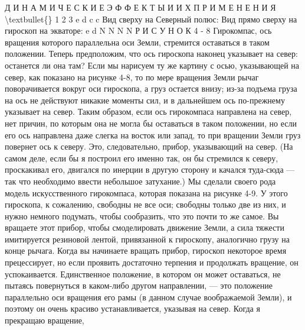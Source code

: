 \documentclass[10pt,oneside]{article}
\begin{document}
Д И Н А М И Ч Е С К И Е  Э Ф Ф Е К Т Ы  И  И Х  П Р И М Е Н Е Н И Я \textbackslash{}textbullet\{\} 1 2 3 e d c c Вид сверху на Северный полюс: Вид прямо сверху на гироскоп на экваторе: e d N N N N Р И С У Н О К  4 - 8 Гирокомпас, ось вращения которого параллельна оси Земли, стремится оставаться в таком положении. Теперь предположим, что ось гироскопа наконец указывает на север: останется ли она там? Если мы нарисуем ту же картину с осью, указывающей на север, как показано на рисунке 4-8, то по мере вращения Земли рычаг поворачивается вокруг оси гироскопа, а груз остается внизу; из-за подъема груза на ось не действуют никакие моменты сил, и в дальнейшем ось по-прежнему указывает на север. Таким образом, если ось гирокомпаса направлена на север, нет причин, по которым она не могла бы оставаться в таком положении, но если его ось направлена даже слегка на восток или запад, то при вращении Земли груз повернет ось к северу. Это, следовательно, прибор, указывающий на север. (На самом деле, если бы я построил его именно так, он бы стремился к северу, проскакивал его, двигался по инерции в другую сторону и качался туда-сюда --- так что необходимо ввести небольшое затухание.) Мы сделали своего рода модель искусственного гирокомпаса, которая показана на рисунке 4-9. У этого гироскопа, к сожалению, свободны не все оси; свободны только две из них, и нужно немного подумать, чтобы сообразить, что это почти то же самое. Вы вращаете этот прибор, чтобы смоделировать движение Земли, а сила тяжести имитируется резиновой лентой, привязанной к гироскопу, аналогично грузу на конце рычага. Когда вы начинаете вращать прибор, гироскоп некоторое время прецессирует, но если проявить достаточно терпения и продолжать вращение, он успокаивается. Единственное положение, в котором он может оставаться, не пытаясь повернуться в каком-либо другом направлении, --- это положение параллельно оси вращения его рамы (в данном случае воображаемой Земли), и поэтому он очень красиво устанавливается, указывая на север. Когда я прекращаю вращение,\par
\end{document}
